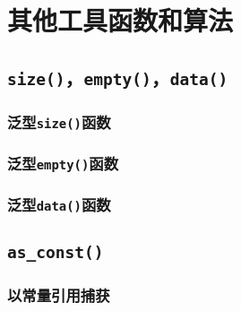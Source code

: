 \chapter{其他工具函数和算法}\label{ch25}

\section{\texttt{size()}，\texttt{empty()}，\texttt{data()}}

\subsection{泛型\texttt{size()}函数}

\subsection{泛型\texttt{empty()}函数}

\subsection{泛型\texttt{data()}函数}

\section{\texttt{as\_const()}}

\subsection{以常量引用捕获}\label{ch25.2.1}